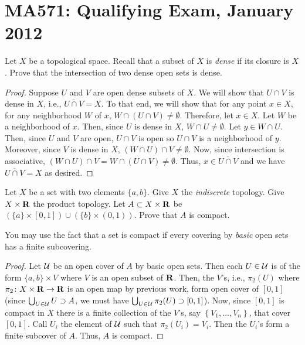 \chapter{MA571: Qualifying Exam, January 2012}
\begin{problem}
Let $X$ be a topological space. Recall that a subset of $X$ is \emph{dense}
if its closure is $X$. Prove that the intersection of two dense open sets is
dense.
\end{problem}
\begin{proof}
Suppose $U$ and $V$ are open dense subsets of $X$. We will show that $U\cap
V$ is dense in $X$, i.e., $\overline{U\cap V}=X$. To that end, we will show
that for any point $x\in X$, for any neighborhood $W$ of $x$, $W\cap(U\cap
V)\neq\emptyset$. Therefore, let $x\in X$. Let $W$ be a neighborhood of
$x$. Then, since $U$ is dense in $X$, $W\cap U\neq\emptyset$. Let $y\in
W\cap U$. Then, since $U$ and $V$ are open, $U\cap V$ is open so $U\cap V$
is a neighborhood of $y$. Moreover, since $V$ is dense in $X$, $(W\cap
U)\cap V\neq\emptyset$. Now, since intersection is associative, $(W\cap
U)\cap V=W\cap(U\cap V)\neq\emptyset$. Thus, $x\in\overline{U\cap V}$ and
we have $\overline{U\cap V}=X$ as desired.
\end{proof}

\begin{problem}
Let $X$ be a set with two elements $\{a,b\}$. Give $X$ the
\emph{indiscrete} topology. Give $X\times\mathbf{R}$ the product topology. Let
$A\subset X\times\mathbf{R}$ be $(\{a\}\times[0,1])\cup(\{b\}\times(0,1))$. Prove
that $A$ is compact.

You may use the fact that a set is compact if every covering by
\emph{basic} open sets has a finite subcovering.
\end{problem}
\begin{proof}
Let $\mathcal{U}$ be an open cover of $A$ by basic open sets. Then each
$U\in\mathcal{U}$ is of the form $\{a,b\}\times V$ where $V$ is an open subset of
$\mathbf{R}$. Then, the $V$'s, i.e., $\pi_2(U)$ where $\pi_2\colon
X\times\mathbf{R}\to\mathbf{R}$ is an open map by previous work, form open cover of
$[0,1]$ (since $\bigcup_{U\in\mathcal{U}} U\supset A$, we must have
$\bigcup_{U\in\mathcal{U}}\pi_2(U)\supset[0,1]$). Now, since $[0,1]$ is compact
in $X$ there is a finite collection of the $V$'s, say
$\left\{V_1,...,V_n\right\}$, that cover $[0,1]$. Call $U_i$ the element of
$\mathcal{U}$ such that $\pi_2(U_i)=V_i$. Then the $U_i$'s form a finite subcover
of $A$. Thus, $A$ is compact.
\end{proof}

